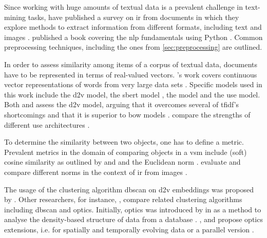 Since working with huge amounts of textual data is a prevalent challenge in text-mining tasks,
\citeauthor{InformationRetrieval1999} have published a survey on \ac{ir} from documents in which
they explore methods to extract information from different formats, including text and images \cite{InformationRetrieval1999}.
\citeauthor{nlp-book2009} published a book covering the \ac{nlp} fundamentals using Python \cite{nlp-book2009}.
Common preprocessing techniques, including the ones from \autoref{sec:preprocessing} are outlined. 


In order to assess similarity among items of a corpus of textual data, documents have to be represented in terms of real-valued vectors.
\citeauthor{WordRep2013}'s work covers continuous vector representations of words from very large data sets \cite{WordRep2013}.
Specific models used in this work include 
the \ac{d2v} model, the \ac{sbert} model \cite{HfsentTrans2019}, the \infersent{} model \cite{inferSent2018} and the \ac{use} model.
Both \citeauthor{clusteringDocs2020} and \citeauthor{SentRep2014} assess the \ac{d2v} model, 
arguing that it overcomes several of \ac{tfidf}'s shortcomings \cite{clusteringDocs2020} and that it is superior to \ac{bow} models \cite{SentRep2014}.
\citeauthor{UniversalSentEnc2018} compare the strengths of different \ac{use} architectures \cite{UniversalSentEnc2018}.


To determine the similarity between two objects, one has to define a metric.
Prevalent metrics in the domain of comparing objects in a \ac{vsm} include (soft) cosine similarity 
as outlined by \citeauthor{soft_cosine2014} and \citeauthor{soft_cosine2017} \cite{soft_cosine2014, soft_cosine2017}
and the Euclidean norm \cite{euclidean_l2_norm2015}.
\citeauthor{euclidean_l2_norm2015} evaluate and compare different norms in the context of \ac{ir} from images \cite{euclidean_l2_norm2015}.


The usage of the clustering algorithm \ac{dbscan} on \ac{d2v} embeddings was proposed by \citeauthor{clusteringDocs2020} \cite{clusteringDocs2020}.
Other researchers, for instance, \citeauthor{OPTICS_kMeans_2016}, compare related clustering algorithms including \ac{dbscan} and \ac{optics}.
Initially, \ac{optics} was introduced by \citeauthor{OPTICS1999} in \citeyear{OPTICS1999} as a method to analyse the density-based structure of data from a database \cite{OPTICS1999}.
\citeauthor{OPTICS2013}, \citeauthor{OPTICS2014} and \citeauthor{OPTICS2016} propose \ac{optics} extensions, 
i.e. for spatially and temporally evolving data or a parallel version \cite{OPTICS2013, OPTICS2014, OPTICS2016}.


